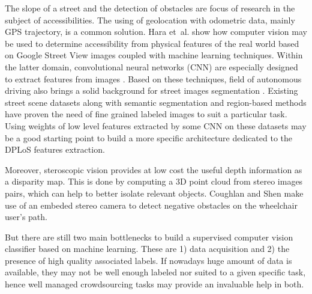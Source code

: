 \documentclass[10pt,conference,a4paper]{IEEEtran}
\begin{document}
The slope of a street and the detection of obstacles are focus of research in the subject of accessibilities. The using of geolocation with odometric data, mainly GPS trajectory, is a common solution. Hara et~al. \cite{hara_tohme:_2014} show how computer vision may be used to determine accessibility from physical features of the real world based on Google Street View images coupled with machine learning techniques. Within the latter domain, convolutional neural networks (CNN) are especially designed to extract features from images \cite{lecun1995convolutional}. 
Based on these techniques, field of autonomous driving also brings a solid background for street images segmentation \cite{alvarez2012road}. Existing street scene datasets %
along with semantic segmentation and region-based methods \cite{neuhold2017mapillary} have proven the need of fine grained labeled images to suit a particular task. Using weights of low level features extracted by some CNN on these datasets may be a good starting point to build a more specific architecture dedicated to the DPLoS features extraction.


Moreover, steroscopic vision %
provides at low cost the useful depth information as a disparity map. This is done by computing a 3D point cloud from stereo images pairs, which can help to better isolate relevant objects.
Coughlan and Shen \cite{coughlan_terrain_2007} %
make use of an embeded stereo camera to detect negative obstacles on the wheelchair user's path. 











But there are still two main bottlenecks to build a supervised computer vision classifier based on machine learning. These are 1) data acquisition and 2) the presence of high quality associated labels. If nowadays huge amount of data is available, they may not be well enough labeled nor suited to a given specific task, hence well managed crowdsourcing tasks may provide an invaluable help in both.
\end{document}
